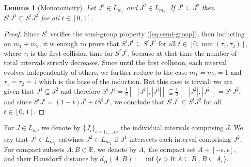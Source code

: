 \documentclass[11pt]{article}
\newtheorem{lemma}[thm]{Lemma}
\theoremstyle{definition}
\theoremstyle{proof}
\DeclareMathOperator{\+}{\mathop{\tilde{+}}}
\newcommand{\R}{\mathbb{R}}
\newcommand{\J}{L}
\newcommand{\eps}{\epsilon}
\numberwithin{equation}{section}
\numberwithin{equation}{section}
\begin{document}
\begin{lemma}[Monotonicity] \label{lem:StMonotone}
Let $J^1 \in \J_{m_1}$ and $J^2 \in \J_{m_2}$. If $J^1 \subseteq J^2$ then $S^t J^1 \subseteq S^t J^2$ for all $t \in [0,1]$.
\end{lemma}
\begin{proof}
Since $S^t$ verifies the semi-group property (\ref{eq:semi-group}), then inducting on $m_1+m_2$, it is enough to prove that $S^t J^1 \subseteq S^t J^2$ for all $t \in [0,\min(\tau_1,\tau_2)]$, where $\tau_i$ is the first collision time for $S^t J^i$, because at that time the number of total intervals strictly decreases. Since until the first collision, each interval evolves independently of others, we further reduce to the case $m_1 = m_2 = 1$ and $\tau_1 = \tau_2 = 1$ which is the base of the induction. But this case is trivial: we are given that $J^1 \subseteq J^2$ and therefore $S^1 J^1 = \frac{1}{2} [-|J^1| , |J^1|] \subseteq \frac{1}{2} [-|J^2| ,|J^2|] = S^1 J^2$, and since $S^t J^i = (1-t) J^i + t S^1 J^i$, we conclude that $S^t J^1 \subseteq S^t J^2$ for all $t \in [0,1]$. 
\end{proof}


For $J \in \J_m$, we denote by $\{J_i\}_{i=1,\ldots,m}$ the individual intervals comprising $J$. We say that $J^1 \in \J_{m_1}$ entwines $J^2 \in \J_{m_2}$ if $J^1$ intersects each interval comprising $J^2$. 
For compact subsets $A,B \subset \R$, we denote by $A_\eps$ the compact set $A + [-\eps,\eps]$, and their Hausdorff distance by $d_H(A,B) := \inf \{\eps > 0 : A \subseteq B_\eps , B \subseteq A_\eps \}$. 
\end{document}
